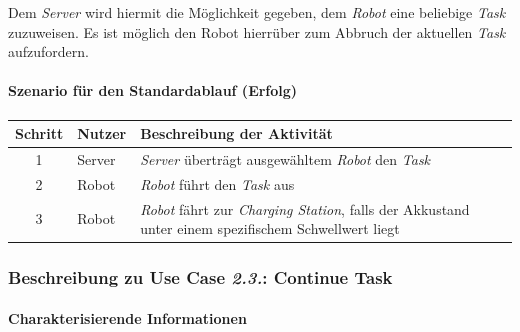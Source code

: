 				Dem \emph{Server} wird hiermit die Möglichkeit gegeben, dem \emph{Robot} eine beliebige \emph{Task} zuzuweisen. Es ist möglich den Robot hierrüber zum Abbruch der aktuellen \emph{Task} aufzufordern.
				
				\paragraph*{Szenario für den Standardablauf (Erfolg)}
				
				\begin{table}[H]
					\centering
					\begin{tabularx}{\textwidth}{|c|p{2cm}|X|}
						\hline
						Schritt & Nutzer & Beschreibung der Aktivität \\ \hline
						1 & Server & \emph{Server} überträgt ausgewähltem \emph{Robot} den \emph{Task} \\
						2 & Robot & \emph{Robot} führt den \emph{Task} aus \\
						3 & Robot & \emph{Robot} fährt zur \emph{Charging Station}, falls der Akkustand unter einem spezifischem Schwellwert liegt\\
						\hline
					\end{tabularx}
				\end{table}
				
				
				\pagebreak
				
				
			\subsubsection{Beschreibung zu Use Case \emph{2.3.}: Continue Task}
			
			\paragraph*{Charakterisierende Informationen}
			
